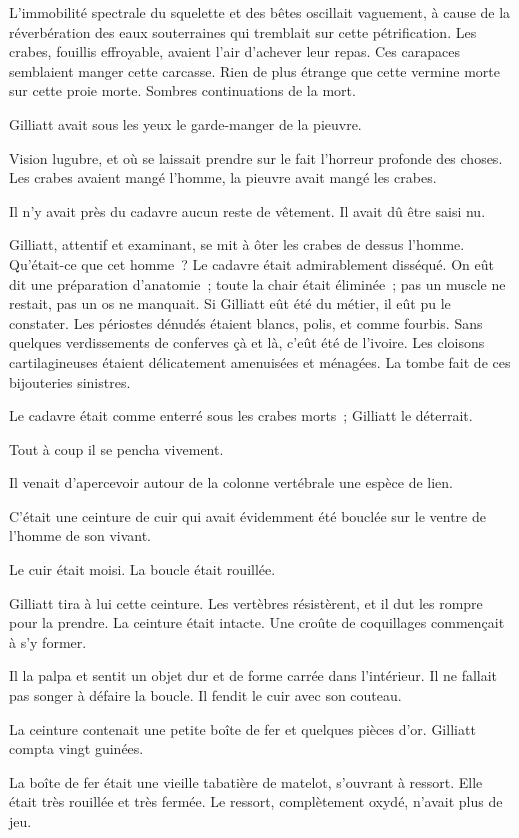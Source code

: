 \documentclass[french,twoside]{book} %
\begin{document}
L’immobilité spectrale du squelette et des bêtes oscillait vaguement, à cause de la réverbération des eaux souterraines qui tremblait sur cette pétrification. Les crabes, fouillis effroyable, avaient l’air d’achever leur repas. Ces carapaces semblaient manger cette carcasse. Rien de plus étrange que cette vermine morte sur cette proie morte. Sombres continuations de la mort.\par
Gilliatt avait sous les yeux le garde-manger de la pieuvre.\par
Vision lugubre, et où se laissait prendre sur le fait l’horreur profonde des choses. Les crabes avaient mangé l’homme, la pieuvre avait mangé les crabes.\par
Il n’y avait près du cadavre aucun reste de vêtement. Il avait dû être saisi nu.\par
Gilliatt, attentif et examinant, se mit à ôter les crabes de dessus l’homme. Qu’était-ce que cet homme ? Le cadavre était admirablement disséqué. On eût dit une préparation d’anatomie ; toute la chair était éliminée ; pas un muscle ne restait, pas un os ne manquait. Si Gilliatt eût été du métier, il eût pu le constater.  Les périostes dénudés étaient blancs, polis, et comme fourbis. Sans quelques verdissements de conferves çà et là, c’eût été de l’ivoire. Les cloisons cartilagineuses étaient délicatement amenuisées et ménagées. La tombe fait de ces bijouteries sinistres.\par
Le cadavre était comme enterré sous les crabes morts ; Gilliatt le déterrait.\par
Tout à coup il se pencha vivement.\par
Il venait d’apercevoir autour de la colonne vertébrale une espèce de lien.\par
C’était une ceinture de cuir qui avait évidemment été bouclée sur le ventre de l’homme de son vivant.\par
Le cuir était moisi. La boucle était rouillée.\par
Gilliatt tira à lui cette ceinture. Les vertèbres résistèrent, et il dut les rompre pour la prendre. La ceinture était intacte. Une croûte de coquillages commençait à s’y former.\par
Il la palpa et sentit un objet dur et de forme carrée dans l’intérieur. Il ne fallait pas songer à défaire la boucle. Il fendit le cuir avec son couteau.\par
La ceinture contenait une petite boîte de fer et quelques pièces d’or. Gilliatt compta vingt guinées.\par
La boîte de fer était une vieille tabatière de matelot, s’ouvrant à ressort. Elle était très rouillée et très fermée. Le ressort, complètement oxydé, n’avait plus de jeu.\par
\end{document}
